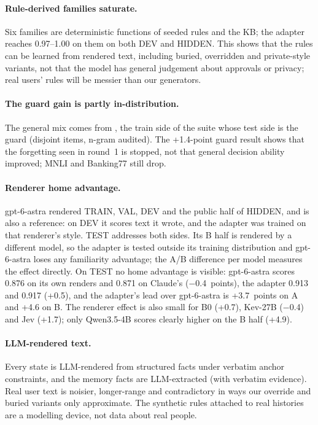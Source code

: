 \documentclass{article}
\newcommand{\code}[1]{\texttt{\detokenize{#1}}}
\begin{document}
\paragraph{Rule-derived families saturate.}
Six families are deterministic functions of seeded rules and the KB; the adapter reaches 0.97--1.00 on them on both DEV
and HIDDEN. This shows that the rules can be learned from rendered text, including buried, overridden and
private-style variants, not that the model has general judgement about approvals or privacy; real users' rules will be
messier than our generators.

\paragraph{The guard gain is partly in-distribution.}
The general mix comes from \code{decision-v2/train}, the train side of the suite whose test side is the
\code{decision-v7} guard (disjoint items, n-gram audited). The +1.4-point guard result shows that the forgetting seen in
round~1 is stopped, not that general decision ability improved; MNLI and Banking77 still drop.

\paragraph{Renderer home advantage.}
gpt-6-astra rendered TRAIN, VAL, DEV and the public half of HIDDEN, and is also a reference: on DEV it scores text it
wrote, and the adapter was trained on that renderer's style. TEST addresses both sides. Its B half is rendered by a
different model, so the adapter is tested outside its training distribution and gpt-6-astra loses any familiarity
advantage; the A/B difference per model measures the effect directly. On TEST no home advantage is visible:
gpt-6-astra scores 0.876 on its own renders and 0.871 on Claude's ($-$0.4~points), the adapter 0.913 and 0.917 (+0.5),
and the adapter's lead over gpt-6-astra is +3.7~points on A and +4.6 on B. The renderer effect is also small for B0
(+0.7), Kev-27B ($-$0.4) and Jev (+1.7); only Qwen3.5-4B scores clearly higher on the B half (+4.9).

\paragraph{LLM-rendered text.}
Every state is LLM-rendered from structured facts under verbatim anchor constraints, and the memory facts are
LLM-extracted (with verbatim evidence). Real user text is noisier, longer-range and contradictory in ways our override
and buried variants only approximate. The synthetic rules attached to real histories are a modelling device, not data
about real people.
\end{document}
